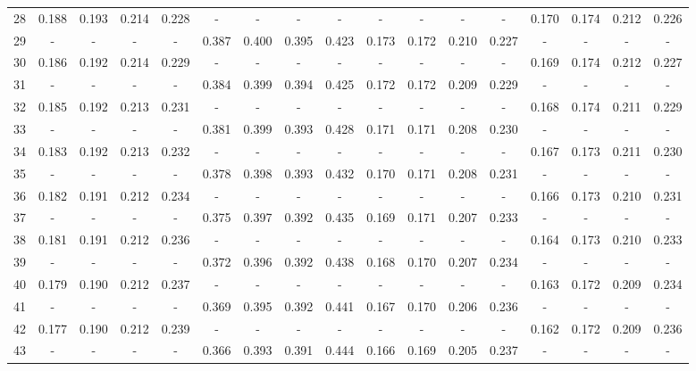 \documentclass{report}
\begin{document}
\begin{appendices}
\begin{table}
\begin{tabular}{|c|cccc|cccc|cccc|cccc|}
28 & 0.188 & 0.193 & 0.214 & 0.228 &   -   &   -   &   -   &   -   &   -   &   -   &   -   &   -   & 0.170 & 0.174 & 0.212 & 0.226\\
29 &   -   &   -   &   -   &   -   & 0.387 & 0.400 & 0.395 & 0.423 & 0.173 & 0.172 & 0.210 & 0.227 &   -   &   -   &   -   &   -  \\
30 & 0.186 & 0.192 & 0.214 & 0.229 &   -   &   -   &   -   &   -   &   -   &   -   &   -   &   -   & 0.169 & 0.174 & 0.212 & 0.227\\
31 &   -   &   -   &   -   &   -   & 0.384 & 0.399 & 0.394 & 0.425 & 0.172 & 0.172 & 0.209 & 0.229 &   -   &   -   &   -   &   -  \\
32 & 0.185 & 0.192 & 0.213 & 0.231 &   -   &   -   &   -   &   -   &   -   &   -   &   -   &   -   & 0.168 & 0.174 & 0.211 & 0.229\\
33 &   -   &   -   &   -   &   -   & 0.381 & 0.399 & 0.393 & 0.428 & 0.171 & 0.171 & 0.208 & 0.230 &   -   &   -   &   -   &   -  \\
34 & 0.183 & 0.192 & 0.213 & 0.232 &   -   &   -   &   -   &   -   &   -   &   -   &   -   &   -   & 0.167 & 0.173 & 0.211 & 0.230\\
35 &   -   &   -   &   -   &   -   & 0.378 & 0.398 & 0.393 & 0.432 & 0.170 & 0.171 & 0.208 & 0.231 &   -   &   -   &   -   &   -  \\
36 & 0.182 & 0.191 & 0.212 & 0.234 &   -   &   -   &   -   &   -   &   -   &   -   &   -   &   -   & 0.166 & 0.173 & 0.210 & 0.231\\
37 &   -   &   -   &   -   &   -   & 0.375 & 0.397 & 0.392 & 0.435 & 0.169 & 0.171 & 0.207 & 0.233 &   -   &   -   &   -   &   -  \\
38 & 0.181 & 0.191 & 0.212 & 0.236 &   -   &   -   &   -   &   -   &   -   &   -   &   -   &   -   & 0.164 & 0.173 & 0.210 & 0.233\\
39 &   -   &   -   &   -   &   -   & 0.372 & 0.396 & 0.392 & 0.438 & 0.168 & 0.170 & 0.207 & 0.234 &   -   &   -   &   -   &   -  \\
40 & 0.179 & 0.190 & 0.212 & 0.237 &   -   &   -   &   -   &   -   &   -   &   -   &   -   &   -   & 0.163 & 0.172 & 0.209 & 0.234\\
41 &   -   &   -   &   -   &   -   & 0.369 & 0.395 & 0.392 & 0.441 & 0.167 & 0.170 & 0.206 & 0.236 &   -   &   -   &   -   &   -  \\
42 & 0.177 & 0.190 & 0.212 & 0.239 &   -   &   -   &   -   &   -   &   -   &   -   &   -   &   -   & 0.162 & 0.172 & 0.209 & 0.236\\
43 &   -   &   -   &   -   &   -   & 0.366 & 0.393 & 0.391 & 0.444 & 0.166 & 0.169 & 0.205 & 0.237 &   -   &   -   &   -   &   -  \\

\end{tabular}
\end{table}
\end{appendices}
\end{document}

